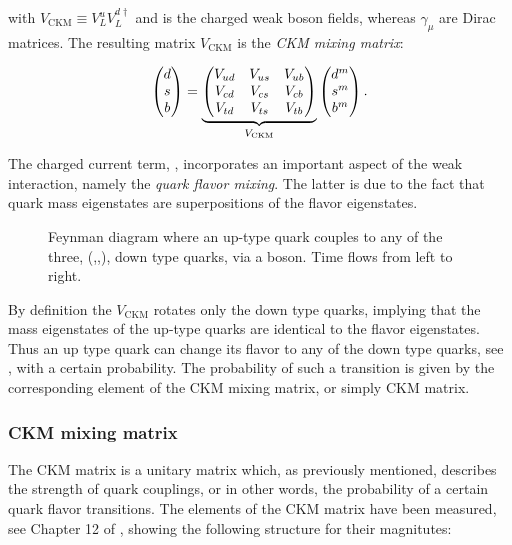 \noindent with $V_{\text{CKM}} \equiv V^u_LV^{d\dagger}_L$ and \Wpm is the charged weak boson fields, whereas $\gamma_\mu$ are Dirac matrices.
The resulting matrix $V_{\text{CKM}}$ is the  {\it CKM mixing matrix}:

\begin{equation}
  \centering
  \begin{pmatrix} \dquark \\ \squark \\ \bquark  \end{pmatrix} =
  \underbrace{\begin{pmatrix} \Vud & \Vus & \Vub \\ \Vcd & \Vcs & \Vcb \\ \Vtd & \Vts & \Vtb \end{pmatrix}}_{V_{\text{CKM}}}
    \begin{pmatrix} \dquark^m \\ \squark^m \\ \bquark^m  \end{pmatrix}.
      \label{quark_field_rotation}
  \end{equation}

The charged current term, , incorporates an important aspect of the weak interaction,
namely the {\it quark flavor mixing}. The latter is due to the fact that quark mass eigenstates are superpositions
of the flavor eigenstates.

\begin{figure}[h!]
  \centering
  {\sffamily }
  \caption{Feynman diagram where an up-type quark couples to any of the three, (\dquark,\squark,\bquark), down type quarks,
           via a \Wp boson. Time flows from left to right.}
  \label{QuarkMixing}
\end{figure}

\noindent By definition the $V_{\text{CKM}}$ rotates only the down type quarks, implying that
the mass eigenstates of the up-type quarks are identical to the flavor eigenstates. Thus an up type quark
can change its flavor to any of the down type quarks, see , with a certain probability.
The probability of such a transition is given by the corresponding element of the CKM mixing matrix, or simply CKM matrix.

\subsubsection{CKM mixing matrix}
The CKM matrix is a unitary matrix which, as previously mentioned, describes the strength of quark couplings, or in other words,
the probability of a certain quark flavor transitions. The elements of the CKM matrix have been measured,
see \eg Chapter 12 of \cite{PDG}, showing the following structure for their magnitutes:

